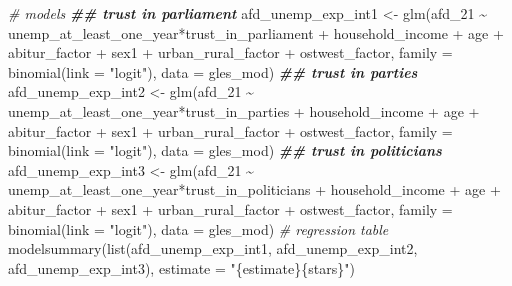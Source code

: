 \documentclass[
]{article}
\newenvironment{Shaded}{\begin{snugshade}}{\end{snugshade}}
\newcommand{\AttributeTok}[1]{\textcolor[rgb]{0.77,0.63,0.00}{#1}}
\newcommand{\CommentTok}[1]{\textcolor[rgb]{0.56,0.35,0.01}{\textit{#1}}}
\newcommand{\DocumentationTok}[1]{\textcolor[rgb]{0.56,0.35,0.01}{\textbf{\textit{#1}}}}
\newcommand{\FunctionTok}[1]{\textcolor[rgb]{0.00,0.00,0.00}{#1}}
\newcommand{\NormalTok}[1]{#1}
\newcommand{\OtherTok}[1]{\textcolor[rgb]{0.56,0.35,0.01}{#1}}
\newcommand{\SpecialCharTok}[1]{\textcolor[rgb]{0.00,0.00,0.00}{#1}}
\newcommand{\StringTok}[1]{\textcolor[rgb]{0.31,0.60,0.02}{#1}}
\begin{document}
\begin{Shaded}
\begin{Highlighting}[]
\CommentTok{\# models }
\DocumentationTok{\#\# trust in parliament}
\NormalTok{afd\_unemp\_exp\_int1 }\OtherTok{\textless{}{-}} \FunctionTok{glm}\NormalTok{(afd\_21 }\SpecialCharTok{\textasciitilde{}}\NormalTok{ unemp\_at\_least\_one\_year}\SpecialCharTok{*}\NormalTok{trust\_in\_parliament }\SpecialCharTok{+}\NormalTok{ household\_income }\SpecialCharTok{+}\NormalTok{ age }\SpecialCharTok{+}\NormalTok{ abitur\_factor }\SpecialCharTok{+}\NormalTok{ sex1 }\SpecialCharTok{+}\NormalTok{ urban\_rural\_factor }\SpecialCharTok{+}\NormalTok{ ostwest\_factor, }
                             \AttributeTok{family =} \FunctionTok{binomial}\NormalTok{(}\AttributeTok{link =} \StringTok{"logit"}\NormalTok{),}
                             \AttributeTok{data =}\NormalTok{ gles\_mod)}
\DocumentationTok{\#\# trust in parties }
\NormalTok{afd\_unemp\_exp\_int2 }\OtherTok{\textless{}{-}} \FunctionTok{glm}\NormalTok{(afd\_21 }\SpecialCharTok{\textasciitilde{}}\NormalTok{ unemp\_at\_least\_one\_year}\SpecialCharTok{*}\NormalTok{trust\_in\_parties }\SpecialCharTok{+}\NormalTok{ household\_income }\SpecialCharTok{+}\NormalTok{ age }\SpecialCharTok{+}\NormalTok{ abitur\_factor }\SpecialCharTok{+}\NormalTok{ sex1 }\SpecialCharTok{+}\NormalTok{ urban\_rural\_factor }\SpecialCharTok{+}\NormalTok{ ostwest\_factor, }
                             \AttributeTok{family =} \FunctionTok{binomial}\NormalTok{(}\AttributeTok{link =} \StringTok{"logit"}\NormalTok{),}
                             \AttributeTok{data =}\NormalTok{ gles\_mod)}
\DocumentationTok{\#\# trust in politicians}
\NormalTok{afd\_unemp\_exp\_int3 }\OtherTok{\textless{}{-}} \FunctionTok{glm}\NormalTok{(afd\_21 }\SpecialCharTok{\textasciitilde{}}\NormalTok{ unemp\_at\_least\_one\_year}\SpecialCharTok{*}\NormalTok{trust\_in\_politicians }\SpecialCharTok{+}\NormalTok{ household\_income }\SpecialCharTok{+}\NormalTok{ age }\SpecialCharTok{+}\NormalTok{ abitur\_factor }\SpecialCharTok{+}\NormalTok{ sex1 }\SpecialCharTok{+}\NormalTok{ urban\_rural\_factor }\SpecialCharTok{+}\NormalTok{ ostwest\_factor, }
                             \AttributeTok{family =} \FunctionTok{binomial}\NormalTok{(}\AttributeTok{link =} \StringTok{"logit"}\NormalTok{),}
                             \AttributeTok{data =}\NormalTok{ gles\_mod)}
\CommentTok{\# regression table }
\FunctionTok{modelsummary}\NormalTok{(}\FunctionTok{list}\NormalTok{(afd\_unemp\_exp\_int1, afd\_unemp\_exp\_int2, afd\_unemp\_exp\_int3),}
             \AttributeTok{estimate =} \StringTok{"\{estimate\}\{stars\}"}\NormalTok{)}
\end{Highlighting}
\end{Shaded}
\end{document}
